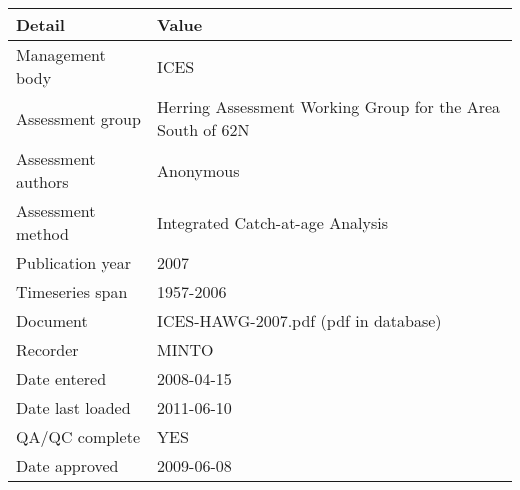 \begin{table}[htb]
\centering
\begin{tabular}{lp{7cm}}
\toprule
Detail & Value \\
\midrule
Management body    & ICES                                                       \\
Assessment group   & Herring Assessment Working Group for the Area South of 62N \\
Assessment authors & Anonymous                                                  \\
Assessment method  & Integrated Catch-at-age Analysis                           \\
Publication year   & 2007                                                       \\
Timeseries span    & 1957-2006                                                  \\
Document           & ICES-HAWG-2007.pdf (pdf in database)                       \\
Recorder           & MINTO                                                      \\
Date entered       & 2008-04-15                                                 \\
Date last loaded   & 2011-06-10                                                 \\
QA/QC complete     & YES                                                        \\
Date approved      & 2009-06-08                                                 \\
\bottomrule
\end{tabular}
\label{tab:assessdet}
\end{table}
